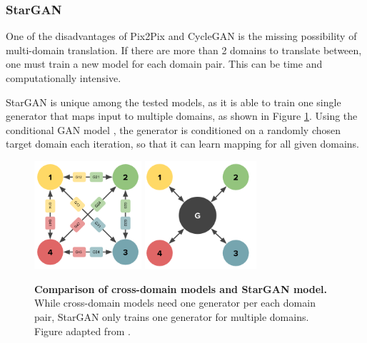 \documentclass{article}
\begin{document}
\pagebreak
\subsubsection{StarGAN}

One of the disadvantages of Pix2Pix and CycleGAN is the missing possibility of multi-domain translation. If there are more than 2 domains to translate between, one must train a new model for each domain pair. This can be time and computationally intensive.

StarGAN \cite{choi_stargan_2017} is unique among the tested models, as it is able to train one single generator that maps input to multiple domains, as shown in Figure \ref{fig:stargan_topo}. Using the conditional GAN model \cite{mirza_conditional_2014}, the generator is conditioned on a randomly chosen target domain each iteration, so that it can learn mapping for all given domains. %

\begin{figure}[h]
\centering
{}
{\includegraphics[height=4cm]{StarGAN_graph}}\hspace{1cm}
{\includegraphics[height=4cm]{StarGAN_graph2}}
\caption{\label{fig:stargan_topo} \textbf{Comparison of cross-domain models and StarGAN model.} While cross-domain models need one generator per each domain pair, StarGAN only trains one generator for multiple domains. Figure adapted from \cite{choi_stargan_2017}.}
\end{figure}
\end{document}
